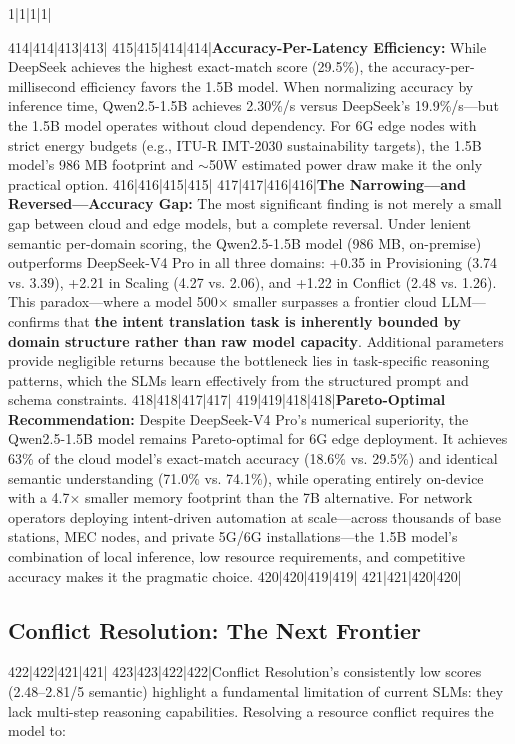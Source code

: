 1|1|1|1|\documentclass[10pt,conference]{IEEEtran}
\begin{document}
414|414|413|413|
415|415|414|414|\textbf{Accuracy-Per-Latency Efficiency:} While DeepSeek achieves the highest exact-match score (29.5\%), the accuracy-per-millisecond efficiency favors the 1.5B model. When normalizing accuracy by inference time, Qwen2.5-1.5B achieves 2.30\%/s versus DeepSeek's 19.9\%/s---but the 1.5B model operates without cloud dependency. For 6G edge nodes with strict energy budgets (e.g., ITU-R IMT-2030 sustainability targets), the 1.5B model's 986 MB footprint and $\sim$50W estimated power draw make it the only practical option.
416|416|415|415|
417|417|416|416|\textbf{The Narrowing---and Reversed---Accuracy Gap:} The most significant finding is not merely a small gap between cloud and edge models, but a complete reversal. Under lenient semantic per-domain scoring, the Qwen2.5-1.5B model (986 MB, on-premise) outperforms DeepSeek-V4 Pro in all three domains: +0.35 in Provisioning (3.74 vs. 3.39), +2.21 in Scaling (4.27 vs. 2.06), and +1.22 in Conflict (2.48 vs. 1.26). This paradox---where a model 500$\times$ smaller surpasses a frontier cloud LLM---confirms that \textbf{the intent translation task is inherently bounded by domain structure rather than raw model capacity}. Additional parameters provide negligible returns because the bottleneck lies in task-specific reasoning patterns, which the SLMs learn effectively from the structured prompt and schema constraints.
418|418|417|417|
419|419|418|418|\textbf{Pareto-Optimal Recommendation:} Despite DeepSeek-V4 Pro's numerical superiority, the Qwen2.5-1.5B model remains Pareto-optimal for 6G edge deployment. It achieves 63\% of the cloud model's exact-match accuracy (18.6\% vs. 29.5\%) and identical semantic understanding (71.0\% vs. 74.1\%), while operating entirely on-device with a 4.7$\times$ smaller memory footprint than the 7B alternative. For network operators deploying intent-driven automation at scale---across thousands of base stations, MEC nodes, and private 5G/6G installations---the 1.5B model's combination of local inference, low resource requirements, and competitive accuracy makes it the pragmatic choice.
420|420|419|419|
421|421|420|420|\subsection{Conflict Resolution: The Next Frontier}
422|422|421|421|
423|423|422|422|Conflict Resolution's consistently low scores (2.48--2.81/5 semantic) highlight a fundamental limitation of current SLMs: they lack multi-step reasoning capabilities. Resolving a resource conflict requires the model to:
\end{document}
